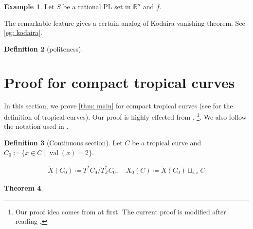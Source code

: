 \documentclass[a4paper,dvipdfmx,reqno,12pt]{amsart}
\theoremstyle{definition}
\newtheorem{Thm}{Theorem}[section]
\newtheorem{Def}[Thm]{Definition}
\newtheorem{Eg}[Thm]{Example}
\newcommand{\deq}{\coloneqq}
\newcommand{\R}{\mathbb{R}}%
\newcommand{\Z}{\mathbb{Z}}%
\newcommand{\opn}[1]{\operatorname{#1}}
\numberwithin{equation}{section}
\begin{document}
\begin{Eg}

Let $S$ be a rational PL set in $\R^{n}$ and
$f$.

The remarkable feature gives a certain analog
of Kodaira vanishing theorem. See \cref{eg: kodaira}.
\end{Eg}

\begin{Def}[{politeness}]

\end{Def}

\section{Proof for compact tropical curves}
In this section, we prove \cref{thm: main} for 
compact tropical curves
(see \cite{mikhalkinTropicalCurvesTheir2008a} 
for the definition of tropical curves).
Our proof is highly effected from 
\cite{knill2012graph,MR2676658,auroux2022lagrangian}.
\footnote{Our proof idea comes from 
\cite{knill2012graph,MR2676658} at first.  
The current proof is modified after reading 
\cite{auroux2022lagrangian}.}.
We also follow the notation used in 
\cite{auroux2022lagrangian}.

\begin{Def}[{Continuous section}]
Let $C$ be a tropical curve and 
$C_{0}\deq \{x\in C\mid \opn{val}(x)=2\}$.

\begin{align}
\check{X}(C_0)\deq T^{*}C_0/T^{*}_{\Z}C_0, \quad 
X_0(C)\deq \check{X}(C_0)\sqcup_{i,s}C
\end{align}

\end{Def}

\begin{Thm}


\end{Thm}
\end{document}
